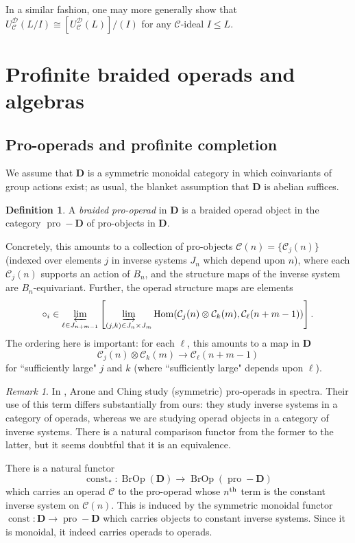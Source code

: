 \documentclass[12pt]{article}
\DeclareMathOperator{\Hom}{Hom}
\DeclareMathOperator{\const}{const}
\DeclareMathOperator{\pro}{pro}
\DeclareMathOperator{\BrOp}{BrOp}
\newcommand{\CC} {\mathcal{C}}
\newcommand{\DD} {\mathcal{D}}
\newcommand{\bD} {\mathbf{D}}
\newcommand{\proD}{\pro\!-\bD}
\newcommand{\beqn}{\begin{equation}}
\newcommand{\eeqn}{\end{equation}}
\newcommand{\nth}{\textsuperscript{th}}
\theoremstyle{plain}
\theoremstyle{definition}
\newtheorem{defn}[thm]{Definition}
\theoremstyle{remark}
\newtheorem{rem}[thm]{Remark}
\begin{document}
In a similar fashion, one may more generally show that $U_{\CC}^{\DD}(L/I) \cong [U_{\CC}^{\DD}(L)]/(I)$ for any $\CC$-ideal $I \leq L$.

\section{Profinite braided operads and algebras}

\subsection{Pro-operads and profinite completion} \label{pro-operad_section}

We assume that $\bD$ is a symmetric monoidal category in which coinvariants of group actions exist; as usual, the blanket assumption that $\bD$ is abelian suffices.  

\begin{defn} \label{pro_op_defn} A \emph{braided pro-operad} in $\bD$ is a braided operad object in the category $\proD$ of pro-objects in $\bD$.  

\end{defn}

Concretely, this amounts to a collection of pro-objects $\CC(n) = \{\CC_j(n)\}$ (indexed over elements $j$ in inverse systems $J_n$ which depend upon $n$), where each $\CC_j(n)$ supports an action of $B_n$, and the structure maps of the inverse system are $B_n$-equivariant. Further, the operad structure maps are elements 
%
$$\circ_i \in \varprojlim_{\ell \in J_{n+m-1}} \left[ \varinjlim_{(j, k) \in J_n \times J_m} \Hom(\CC_j(n) \otimes \CC_k(m), \CC_\ell(n+m-1))\right].$$
%
The ordering here is important: for each $\ell$, this amounts to a map in $\bD$
%
\beqn \label{prof_sub_eqn} \CC_j(n) \otimes \CC_k(m) \to \CC_\ell(n+m-1)\eeqn
%
for  ``sufficiently large" $j$ and $k$ (where ``sufficiently large" depends upon $\ell$).

\begin{rem} In \cite{arone-ching}, Arone and Ching study (symmetric) pro-operads in spectra.  Their use of this term differs substantially from ours: they study inverse systems in a category of operads, whereas we are studying operad objects in a category of inverse systems.  There is a natural comparison functor from the former to the latter, but it seems doubtful that it is an equivalence. \end{rem}

There is a natural functor
%
$$\const_*: \BrOp(\bD) \to \BrOp(\proD)$$
%
which carries an operad $\CC$ to the pro-operad whose $n\nth$ term is the constant inverse system on $\CC(n)$.  This is induced by the symmetric monoidal functor $\const: \bD \to \proD$ which carries objects to constant inverse systems.  Since it is monoidal, it indeed carries operads to operads.
\end{document}
